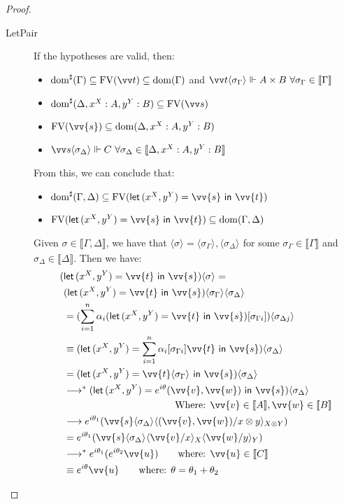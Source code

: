 \documentclass[runningheads,orivec,envcountsame,envcountsect]{llncs}
\newcommand\lra{\longrightarrow}
\newcommand\ansubst[2]{\ensuremath{\langle #1 \rangle_{#2}}}
\newcommand\dom[1]{\mathrm{dom}(#1)}
\newcommand\sdom[1]{\mathrm{dom}^{\sharp}(#1)}
\newcommand\FV[1]{\mathrm{FV}(#1)}
\def\Pair#1#2{(#1,#2)} %
\def\letkeyword{\mathsf{let}}
\def\inkeyword{\mathsf{in}}
\def\LetP#1#2#3#4#5#6{\letkeyword\,\Pair{#1^{#2}}{#3^{#4}}=#5~\inkeyword~#6}
\def\eval{\lra^*}
\def\sem#1{\llbracket#1\rrbracket}
\begin{document}
\begin{proof}
\begin{description}
    \item[LetPair] If the hypotheses are valid, then:
    \begin{itemize}
        \item $\sdom{\Gamma}\subseteq \FV{\vv t} \subseteq \dom{\Gamma}$ and $\vv t \ansubst{\sigma_\Gamma}{}\Vdash A\times B\ \forall \sigma_\Gamma\in\sem\Gamma$
        \item $\sdom{\Delta, {x}^{X}:A, {y}^{Y}:B}\subseteq\FV{\vv s}$
        \item $\FV{\vv{s}}\subseteq \dom{\Delta, {x}^{X}:A, {y}^{Y}:B}$
        \item $\vv s \ansubst{\sigma_\Delta}{}\Vdash C\ \forall \sigma_\Delta\in\sem{\Delta, {x}^{X}:A, {y}^{Y}:B}$
    \end{itemize}
    From this, we can conclude that:
    \begin{itemize}
        \item $\sdom{\Gamma,\Delta}\subseteq\FV{\LetP{x}{X}{y}{Y}{\vv{s}}{\vv{t}}}$
        \item $\FV{\LetP{x}{X}{y}{Y}{\vv{s}}{\vv{t}}}\subseteq\dom{\Gamma,\Delta}$
    \end{itemize}
    
    Given $\sigma\in\sem{\Gamma,\Delta}$, we have that $\ansubst{\sigma}{}=\ansubst{\sigma_\Gamma}{},\ansubst{\sigma_\Delta}{}$ for some $\sigma_\Gamma\in\sem\Gamma$ and $\sigma_\Delta\in\sem\Delta$. Then we have:
    \begin{align*}
        (&\LetP{x}{X}{y}{Y}{\vv{t}}{\vv{s}})\ansubst{\sigma}{} = \\
        &(\LetP{x}{X}{y}{Y}{\vv{t}}{\vv{s}})\ansubst{\sigma_\Gamma}{}\ansubst{\sigma_\Delta}{}\\
        &= (\sum_{i=1}^{n}\alpha_i(\LetP{x}{X}{y}{Y}{\vv{t}}{\vv{s}})[\sigma_{\Gamma i}])\ansubst{\sigma_{\Delta j}}{}\\
        &\equiv (\LetP{x}{X}{y}{Y}{\sum_{i=1}^{n}\alpha_i[\sigma_{\Gamma i}]\vv{t}}{\vv{s}})\ansubst{\sigma_\Delta}{}\\
        &= (\LetP{x}{X}{y}{Y}{\vv{t}\ansubst{\sigma_\Gamma}{}}{\vv{s}})\ansubst{\sigma_\Delta}{}\\
        &\eval (\LetP{x}{X}{y}{Y}{e^{i\theta} \Pair{\vv{v}}{\vv{w}}}{\vv{s}})\ansubst{\sigma_\Delta}{}\\
        &\hspace*{4cm}{\text{Where: }}\vv{v}\in\sem{A},\vv{w}\in\sem{B}\\
        &\lra e^{i\theta_1} (\vv{s}\ansubst{\sigma_\Delta}{}\ansubst{\Pair{\vv{v}}{\vv{w}}/x\otimes y}{X\otimes Y})\\
        &= e^{i\theta_1} (\vv{s}\ansubst{\sigma_\Delta}{}\ansubst{\vv{v}/x}{X}\ansubst{\vv{w}/y}{Y})\\
        &\eval e^{i\theta_1}  (e^{i\theta_2}  \vv{u})\qquad\text{where: }\vv{u}\in\sem{C}\\
        &\equiv e^{i\theta}  \vv{u}\qquad\text{where: }\theta=\theta_1 + \theta_2
    \end{align*}
    

\end{description}
\end{proof}
\end{document}
